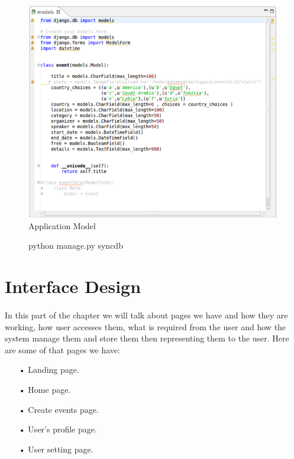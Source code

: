 \documentclass[12pt,a4paper,class,twoside,openany]{report}
\begin{document}
{\begin{figure}
\begin{center}
\includegraphics[height=3.5 in]{4-14}
\caption{Application Model}
\label{fg:4-14}
\end{center}
\end{figure}

\begin{figure}
\begin{center}
\caption{python manage.py syncdb}
\label{fg:4-15}
\end{center}
\end{figure}

\section{Interface Design}
\paragraph*{\hspace{.9 cm} } In this part of the chapter we will talk about pages we have and how they are working, how user accesses them, what is required from the user and how the system manage them and store them then representing them to the user.
 Here are some of that pages we have:
 \begin{itemize}
 \item[•] Landing page.
\item[•] Home page.
\item[•] Create events page.
\item[•]  User's profile page.
\item[•]User setting page.
 \end{itemize}
}
\end{document}
